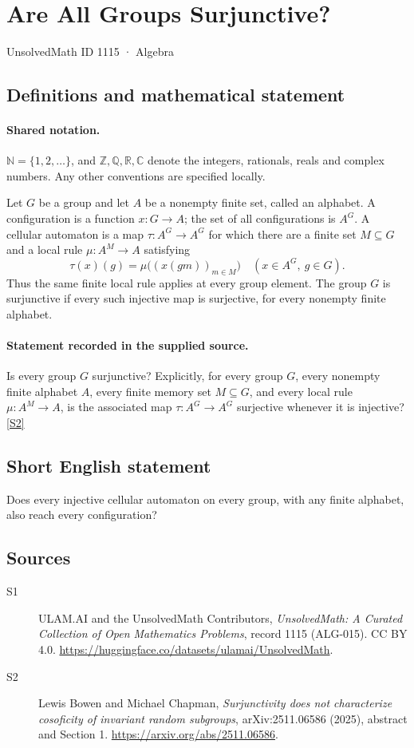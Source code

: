 \documentclass[11pt]{article}
\newcommand{\sref}[2]{\hyperlink{source:#1:#2}{[S#2]}}
\begin{document}
\setcounter{section}{1114}
\section{Are All Groups Surjunctive?}\label{1115}
{\small\sffamily UnsolvedMath ID 1115 · Algebra}
\subsection{Definitions and mathematical statement}

\paragraph{Shared notation.}$\mathbb N=\{1,2,\ldots\}$, and $\mathbb Z,\mathbb Q,\mathbb R,\mathbb C$ denote the integers, rationals, reals and complex numbers. Any other conventions are specified locally.


Let \(G\) be a group and let \(A\) be a nonempty finite set, called
an alphabet.  A configuration is a function \(x:G\to A\); the set of all
configurations is \(A^G\).  A cellular automaton is a map
\(\tau:A^G\to A^G\) for which there are a finite set \(M\subseteq G\)
and a local rule \(\mu:A^M\to A\) satisfying
\[
 \tau(x)(g)=\mu\bigl((x(gm))_{m\in M}\bigr)
       \quad (x\in A^G,\ g\in G).
\]
Thus the same finite local rule applies at every group element.
The group \(G\) is surjunctive if every such injective map is surjective,
for every nonempty finite alphabet.
\paragraph{Statement recorded in the supplied source.}
Is every group \(G\) surjunctive?  Explicitly, for every group
\(G\), every nonempty finite alphabet \(A\), every finite memory set
\(M\subseteq G\), and every local rule \(\mu:A^M\to A\), is the
associated map \(\tau:A^G\to A^G\) surjective whenever it is injective? \sref{1115}{2}
\subsection{Short English statement}
Does every injective cellular automaton on every group, with any finite alphabet, also reach every configuration?
\subsection{Sources}
\begin{description}
\item[\hypertarget{source:1115:1}{S1}] ULAM.AI and the UnsolvedMath Contributors, \emph{UnsolvedMath: A Curated Collection of Open Mathematics Problems}, record 1115 (ALG-015). CC BY 4.0. \url{https://huggingface.co/datasets/ulamai/UnsolvedMath}.
\item[\hypertarget{source:1115:2}{S2}] Lewis Bowen and Michael Chapman, \emph{Surjunctivity does not characterize cosoficity of invariant random subgroups}, arXiv:2511.06586 (2025), abstract and Section 1. \url{https://arxiv.org/abs/2511.06586}.
\end{description}
\label{end:1115}
\end{document}
